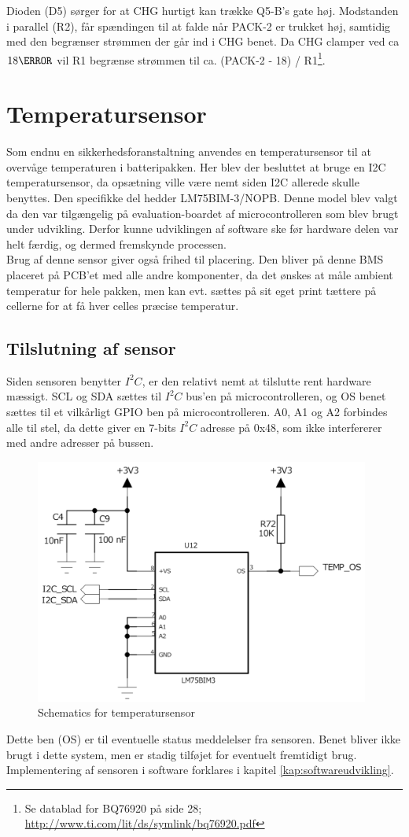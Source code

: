 Dioden (D5) sørger for at CHG hurtigt kan trække Q5-B's gate høj. Modstanden i parallel (R2), får spændingen til at falde når PACK-2 er trukket høj, samtidig med den begrænser strømmen der går ind i CHG benet. Da CHG clamper ved ca $18\volt$ vil R1 begrænse strømmen til ca. (PACK-2 - 18\volt) / R1\footnote{Se datablad for BQ76920 på side 28; \url{http://www.ti.com/lit/ds/symlink/bq76920.pdf}}.

\section{Temperatursensor} \label{sec:temperatur}
Som endnu en sikkerhedsforanstaltning anvendes en temperatursensor til at overvåge temperaturen i batteripakken. Her blev der besluttet at bruge en I2C temperatursensor, da opsætning ville være nemt siden I2C allerede skulle benyttes. Den specifikke del hedder LM75BIM-3/NOPB. Denne model blev valgt da den var tilgængelig på evaluation-boardet af microcontrolleren som blev brugt under udvikling. Derfor kunne udviklingen af software ske før hardware delen var helt færdig, og dermed fremskynde processen. \\ 

Brug af denne sensor giver også frihed til placering. Den bliver på denne BMS placeret på PCB'et med alle andre komponenter, da det ønskes at måle ambient temperatur for hele pakken, men kan evt. sættes på sit eget print tættere på cellerne for at få hver celles præcise temperatur. 

\subsection{Tilslutning af sensor}
Siden sensoren benytter $I^2C$, er den relativt nemt at tilslutte rent hardware mæssigt. SCL og SDA sættes til $I^2C$ bus'en på microcontrolleren, og OS benet sættes til et vilkårligt GPIO ben på microcontrolleren. A0, A1 og A2 forbindes alle til stel, da dette giver en 7-bits $I^2C$ adresse på 0x48, som ikke interfererer med andre adresser på bussen. \\

\begin{figure}[h]
	\centering
	\includegraphics[width=11cm]{billeder/temp_sensor_sch.png}
	\caption{Schematics for temperatursensor}
	\label{fig:temp_sensor}
\end{figure}

Dette ben (OS) er til eventuelle status meddelelser fra sensoren. Benet bliver ikke brugt i dette system, men er stadig tilføjet for eventuelt fremtidigt brug. Implementering af sensoren i software forklares i kapitel \ref{kap:softwareudvikling}.

